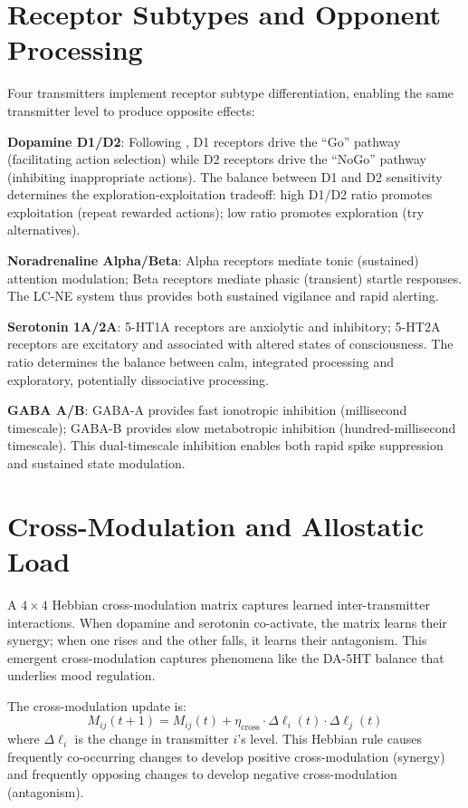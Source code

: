 \documentclass[12pt]{book}
\begin{document}
\section{Receptor Subtypes and Opponent Processing}

Four transmitters implement receptor subtype differentiation, enabling the same transmitter level to produce opposite effects:

\textbf{Dopamine D1/D2}: Following \citet{frank2005}, D1 receptors drive the ``Go'' pathway (facilitating action selection) while D2 receptors drive the ``NoGo'' pathway (inhibiting inappropriate actions). The balance between D1 and D2 sensitivity determines the exploration-exploitation tradeoff: high D1/D2 ratio promotes exploitation (repeat rewarded actions); low ratio promotes exploration (try alternatives).

\textbf{Noradrenaline Alpha/Beta}: Alpha receptors mediate tonic (sustained) attention modulation; Beta receptors mediate phasic (transient) startle responses. The LC-NE system thus provides both sustained vigilance and rapid alerting.

\textbf{Serotonin 1A/2A}: 5-HT1A receptors are anxiolytic and inhibitory; 5-HT2A receptors are excitatory and associated with altered states of consciousness. The ratio determines the balance between calm, integrated processing and exploratory, potentially dissociative processing.

\textbf{GABA A/B}: GABA-A provides fast ionotropic inhibition (millisecond timescale); GABA-B provides slow metabotropic inhibition (hundred-millisecond timescale). This dual-timescale inhibition enables both rapid spike suppression and sustained state modulation.

\section{Cross-Modulation and Allostatic Load}

A $4 \times 4$ Hebbian cross-modulation matrix captures learned inter-transmitter interactions. When dopamine and serotonin co-activate, the matrix learns their synergy; when one rises and the other falls, it learns their antagonism. This emergent cross-modulation captures phenomena like the DA-5HT balance that underlies mood regulation.

The cross-modulation update is:
\begin{equation}
M_{ij}(t+1) = M_{ij}(t) + \eta_{\text{cross}} \cdot \Delta\ell_i(t) \cdot \Delta\ell_j(t)
\end{equation}
where $\Delta\ell_i$ is the change in transmitter $i$'s level. This Hebbian rule causes frequently co-occurring changes to develop positive cross-modulation (synergy) and frequently opposing changes to develop negative cross-modulation (antagonism).
\end{document}
